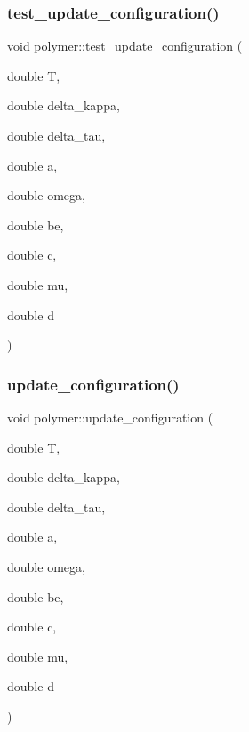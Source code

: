 \hypertarget{classpolymer_a919bef5d8c1c121e48a0cb3fb389dfad}{}\label{classpolymer_a919bef5d8c1c121e48a0cb3fb389dfad} 
\subsubsection{\texorpdfstring{test\+\_\+update\+\_\+configuration()}{test\_update\_configuration()}}
{\footnotesize\ttfamily void polymer\+::test\+\_\+update\+\_\+configuration (\begin{DoxyParamCaption}\item[{double}]{T,  }\item[{double}]{delta\+\_\+kappa,  }\item[{double}]{delta\+\_\+tau,  }\item[{double}]{a,  }\item[{double}]{omega,  }\item[{double}]{be,  }\item[{double}]{c,  }\item[{double}]{mu,  }\item[{double}]{d }\end{DoxyParamCaption})}

\hypertarget{classpolymer_a32064d363a3e98475d1ae4733b214160}{}\label{classpolymer_a32064d363a3e98475d1ae4733b214160} 
\subsubsection{\texorpdfstring{update\+\_\+configuration()}{update\_configuration()}}
{\footnotesize\ttfamily void polymer\+::update\+\_\+configuration (\begin{DoxyParamCaption}\item[{double}]{T,  }\item[{double}]{delta\+\_\+kappa,  }\item[{double}]{delta\+\_\+tau,  }\item[{double}]{a,  }\item[{double}]{omega,  }\item[{double}]{be,  }\item[{double}]{c,  }\item[{double}]{mu,  }\item[{double}]{d }\end{DoxyParamCaption})}

